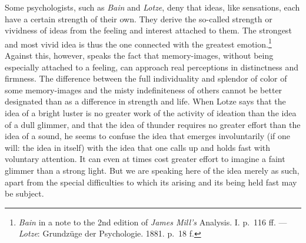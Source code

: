 \documentclass[12pt,a4paper]{book}
\begin{document}
Some psychologists, such as \emph{Bain} and \emph{Lotze}, deny that ideas,
like sensations, each have a certain strength of their own. They derive
the so-called strength or vividness of ideas from the feeling and
interest attached to them. The strongest and most vivid idea is thus the
one connected with the greatest
emotion.\footnote{\emph{Bain} in a note to the 2nd edition of \emph{James
Mill's} Analysis. I. p.~116 ff. --- \emph{Lotze}: Grundzüge der
Psychologie. 1881. p.~18 f.} Against this, however, speaks the fact that
memory-images, without being especially attached to a feeling, can
approach real perceptions in distinctness and firmness. The difference
between the full individuality and splendor of color of some
memory-images and the misty indefiniteness of others cannot be better
designated than as a difference in strength and life. When Lotze says
that the idea of a bright luster is no greater work of the activity of
ideation than the idea of a dull glimmer, and that the idea of thunder
requires no greater effort than the idea of a sound, he seems to confuse
the idea that emerges involuntarily (if one will: the idea in itself) with
the idea that one calls up and holds fast with voluntary attention. It can
even at times cost greater effort to imagine a faint glimmer than a strong
light. But we are speaking here of the idea merely as such, apart from the
special difficulties to which its arising and its being held fast may be
subject.
\end{document}
